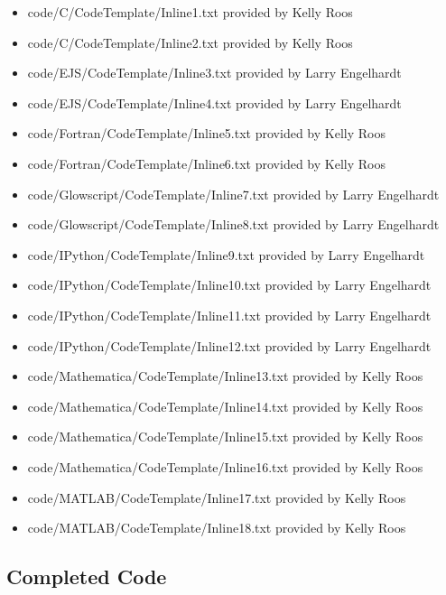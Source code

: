 \documentclass[]{article}
\providecommand{\tightlist}{%
  \setlength{\itemsep}{0pt}\setlength{\parskip}{0pt}}
\begin{document}
\begin{itemize}
\tightlist
\item
  code/C/CodeTemplate/Inline1.txt provided by Kelly Roos
\item
  code/C/CodeTemplate/Inline2.txt provided by Kelly Roos
\item
  code/EJS/CodeTemplate/Inline3.txt provided by Larry Engelhardt
\item
  code/EJS/CodeTemplate/Inline4.txt provided by Larry Engelhardt
\item
  code/Fortran/CodeTemplate/Inline5.txt provided by Kelly Roos
\item
  code/Fortran/CodeTemplate/Inline6.txt provided by Kelly Roos
\item
  code/Glowscript/CodeTemplate/Inline7.txt provided by Larry Engelhardt
\item
  code/Glowscript/CodeTemplate/Inline8.txt provided by Larry Engelhardt
\item
  code/IPython/CodeTemplate/Inline9.txt provided by Larry Engelhardt
\item
  code/IPython/CodeTemplate/Inline10.txt provided by Larry Engelhardt
\item
  code/IPython/CodeTemplate/Inline11.txt provided by Larry Engelhardt
\item
  code/IPython/CodeTemplate/Inline12.txt provided by Larry Engelhardt
\item
  code/Mathematica/CodeTemplate/Inline13.txt provided by Kelly Roos
\item
  code/Mathematica/CodeTemplate/Inline14.txt provided by Kelly Roos
\item
  code/Mathematica/CodeTemplate/Inline15.txt provided by Kelly Roos
\item
  code/Mathematica/CodeTemplate/Inline16.txt provided by Kelly Roos
\item
  code/MATLAB/CodeTemplate/Inline17.txt provided by Kelly Roos
\item
  code/MATLAB/CodeTemplate/Inline18.txt provided by Kelly Roos
\end{itemize}

\subsection{Completed Code}\label{completed-code}
\end{document}
